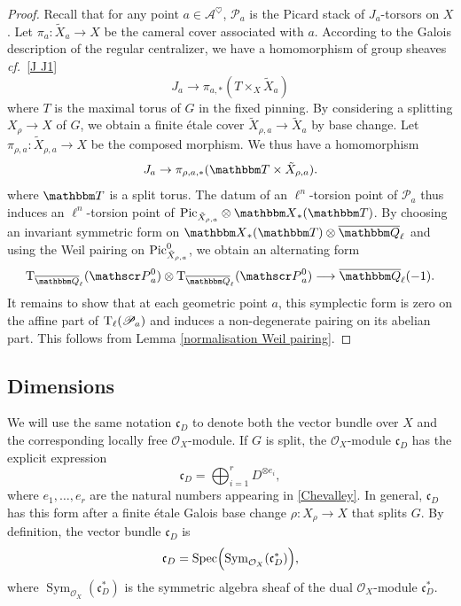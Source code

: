 \documentclass[12pt,english]{smfart}
\numberwithin{equation}{subsection}
\theoremstyle{remark}
\newcommand\calA{{\mathscr A}}
\newcommand\calP{{\mathscr P}}
\newcommand\rmT{{\rm T}}
\newcommand\QQ{{\mathbbm Q}}
\newcommand\bbT{{\mathbbm T}}
\newcommand\bbX{{\mathbbm X}}
\newcommand\cf{{\it cf.\ }}
\newcommand\Ql{{\overline\QQ_\ell}}
\begin{document}
\begin{proof}
Recall that for any point $a\in \calA^\heartsuit$, $\calP_a$ is the Picard stack of $J_a$-torsors on $X$. Let $\pi_a:\tilde X_a\rightarrow X$ be the cameral cover associated with $a$. According to the Galois description of the regular centralizer, we have a homomorphism of group sheaves \cf \ref{J J1}
$$J_a \rightarrow \pi_{a,*}(T\times_X \tilde X_a)$$
where $T$ is the maximal torus of $G$ in the fixed pinning. By considering a splitting $X_\rho\rightarrow X$ of $G$, we obtain a finite \'etale cover $\tilde X_{\rho,a}\rightarrow \tilde X_a$ by base change. Let $\pi_{\rho,a}:\tilde X_{\rho,a}\rightarrow X$ be the composed morphism. We thus have a homomorphism
$$J_a \rightarrow \pi_{\rho,a,*}(\bbT\times \tilde X_{\rho,a}).$$
where $\bbT$ is a split torus. The datum of an $\ell^n$-torsion point of $\calP_a$ thus induces an $\ell^n$-torsion point of ${\rm Pic}_{\tilde X_{\rho,a}}\otimes \bbX_*(\bbT)$. By choosing an invariant symmetric form on $\bbX_*(\bbT)\otimes\Ql$ and using the Weil pairing on ${\rm Pic}^0_{\tilde X_{\rho,a}}$, we obtain an alternating form
$$\rmT_\Ql(\calP_a^0)\otimes \rmT_\Ql(\calP_a^0)\longrightarrow \Ql(-1).$$
It remains to show that at each geometric point $a$, this symplectic form is zero on the affine part of $\rmT_\ell(\calP_a)$ and induces a non-degenerate pairing on its abelian part. This follows from Lemma \ref{normalisation Weil pairing}.
\end{proof}

\subsection{Dimensions}\label{subsection : dimension}
We will use the same notation $\mathfrak{c}_D$ to denote both the vector bundle over $X$
and the corresponding locally free $\mathcal{O}_X$-module. If $G$ is split, the $\mathcal{O}_X$-module $\mathfrak{c}_D$
has the explicit expression
$$
\mathfrak{c}_D=\bigoplus_{i=1}^r D^{\otimes e_i},
$$
where $e_1,\ldots,e_r$ are the natural numbers appearing in \ref{Chevalley}. In general, $\mathfrak{c}_D$
has this form after a finite \'etale Galois base change $\rho: X_\rho \rightarrow X$ that splits $G$.
By definition, the vector bundle $\mathfrak{c}_D$ is
$$
\mathfrak{c}_D=\operatorname{Spec}\Bigl(\operatorname{Sym}_{\mathcal{O}_X}(\mathfrak{c}_D^*)\Bigr),
$$
where $\operatorname{Sym}_{\mathcal{O}_X}(\mathfrak{c}_D^*)$ is the symmetric algebra sheaf of the dual
$\mathcal{O}_X$-module $\mathfrak{c}_D^*$.
\end{document}
